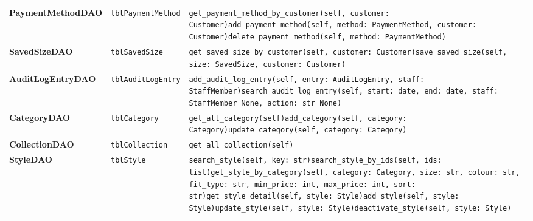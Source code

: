 {\begin{xltabular}{\textwidth}{@{}L{3.5cm} L{3.4cm} Y@{}}
\textbf{PaymentMethodDAO} & \texttt{tblPaymentMethod} & \texttt{get\_\allowbreak{}payment\_\allowbreak{}method\_\allowbreak{}by\_\allowbreak{}customer(self,\allowbreak{} customer: Customer)}\newline \texttt{add\_\allowbreak{}payment\_\allowbreak{}method(self,\allowbreak{} method: PaymentMethod,\allowbreak{} customer: Customer)}\newline \texttt{delete\_\allowbreak{}payment\_\allowbreak{}method(self,\allowbreak{} method: PaymentMethod)} \\
\textbf{SavedSizeDAO} & \texttt{tblSavedSize} & \texttt{get\_\allowbreak{}saved\_\allowbreak{}size\_\allowbreak{}by\_\allowbreak{}customer(self,\allowbreak{} customer: Customer)}\newline \texttt{save\_\allowbreak{}saved\_\allowbreak{}size(self,\allowbreak{} size: SavedSize,\allowbreak{} customer: Customer)} \\
\textbf{AuditLogEntryDAO} & \texttt{tblAuditLogEntry} & \texttt{add\_\allowbreak{}audit\_\allowbreak{}log\_\allowbreak{}entry(self,\allowbreak{} entry: AuditLogEntry,\allowbreak{} staff: StaffMember)}\newline \texttt{search\_\allowbreak{}audit\_\allowbreak{}log\_\allowbreak{}entry(self,\allowbreak{} start: date,\allowbreak{} end: date,\allowbreak{} staff: StaffMember \textbar{} None,\allowbreak{} action: str \textbar{} None)} \\
\textbf{CategoryDAO} & \texttt{tblCategory} & \texttt{get\_\allowbreak{}all\_\allowbreak{}category(self)}\newline \texttt{add\_\allowbreak{}category(self,\allowbreak{} category: Category)}\newline \texttt{update\_\allowbreak{}category(self,\allowbreak{} category: Category)} \\
\textbf{CollectionDAO} & \texttt{tblCollection} & \texttt{get\_\allowbreak{}all\_\allowbreak{}collection(self)} \\
\textbf{StyleDAO} & \texttt{tblStyle} & \texttt{search\_\allowbreak{}style(self,\allowbreak{} key: str)}\newline \texttt{search\_\allowbreak{}style\_\allowbreak{}by\_\allowbreak{}ids(self,\allowbreak{} ids: list)}\newline \texttt{get\_\allowbreak{}style\_\allowbreak{}by\_\allowbreak{}category(self,\allowbreak{} category: Category,\allowbreak{} size: str,\allowbreak{} colour: str,\allowbreak{} fit\_\allowbreak{}type: str,\allowbreak{} min\_\allowbreak{}price: int,\allowbreak{} max\_\allowbreak{}price: int,\allowbreak{} sort: str)}\newline \texttt{get\_\allowbreak{}style\_\allowbreak{}detail(self,\allowbreak{} style: Style)}\newline \texttt{add\_\allowbreak{}style(self,\allowbreak{} style: Style)}\newline \texttt{update\_\allowbreak{}style(self,\allowbreak{} style: Style)}\newline \texttt{deactivate\_\allowbreak{}style(self,\allowbreak{} style: Style)} \\

\end{xltabular}}
